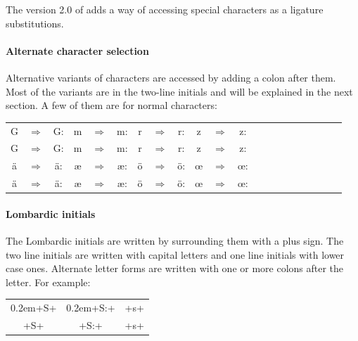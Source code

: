 \documentclass[a4paper, 12pt]{article}
\newcommand{\sample}[1]{{\mstexturafamily\fontsize{18}{18}\selectfont #1}}
\newcommand{\initsample}[1]{{\initsamplefont #1}}
\newcommand{\initsamplefont}{\fontsize{36}{36}\fontspec{Missaali}\spaceskip0.2em}
\begin{document}
The version 2.0 of \Missaali{} adds a way of accessing special
characters as a ligature substitutions. 

\paragraph{Alternate character selection}

Alternative variants of characters are accessed by adding a colon
after them. Most of the variants are in the two-line initials and will
be explained in the next section. A few of them are for normal
characters: 

\begin{center}
  \begin{tabular}[c]{c@{ }c@{ }c c@{ }c@{ }cc@{ }c@{ }c c@{ }c@{ }cc@{ }c@{ }cc@{ }c@{ }cc@{ }c@{ }c}
    \sample{G} & $\Rightarrow$ & \sample{G:} &
    \sample{m} & $\Rightarrow$ & \sample{m:} &
    \sample{r} & $\Rightarrow$ & \sample{r:} &
    \sample{z} & $\Rightarrow$ & \sample{z:} \\

    G & $\Rightarrow$ & G: &
    m & $\Rightarrow$ & m: &
    r & $\Rightarrow$ & r: &
    z & $\Rightarrow$ & z: &  \\


    \sample{ä} & $\Rightarrow$ & \sample{ä:} &
    \sample{æ} & $\Rightarrow$ & \sample{æ:} &
    \sample{ö} & $\Rightarrow$ & \sample{ö:} &
    \sample{œ} & $\Rightarrow$ & \sample{œ:} \\
    

    ä & $\Rightarrow$ & ä: &
    æ & $\Rightarrow$ & æ: &
    ö & $\Rightarrow$ & ö: &
    œ & $\Rightarrow$ & œ: \\

  \end{tabular}

  
\end{center}

\paragraph{Lombardic initials} The Lombardic initials are written by
surrounding them with a plus sign. The two line initials are written
with capital letters and one line initials with lower case ones.
Alternate letter forms are written with one or more colons after the
letter.  For example:

\begin{center}
  \begin{tabular}{ccc}
    \initsample{+S+} &  \initsample{+S:+} & \sample{+s+} \\
    +S+ & +S:+ & +s+ \\
  \end{tabular}
\end{center}
\end{document}

